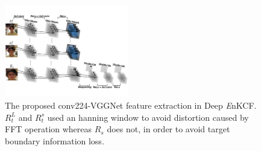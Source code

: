 \documentclass[10pt,twocolumn,letterpaper]{article}
\begin{document}
\begin{figure}[!h]
\centering
\includegraphics[width=0.48\textwidth]{./figures/Filters_Details_CNN.pdf}
\caption{The proposed conv224-VGGNet feature extraction in Deep{\it
    E}nKCF. $R_{t}^{L}$ and $R_{t}^{s}$ used an hanning window to
  avoid distortion caused by FFT operation whereas $R_{s}$ does not,
  in order to avoid target boundary information loss.}
\label{fig:Filters_CNN}
\end{figure}
\end{document}
